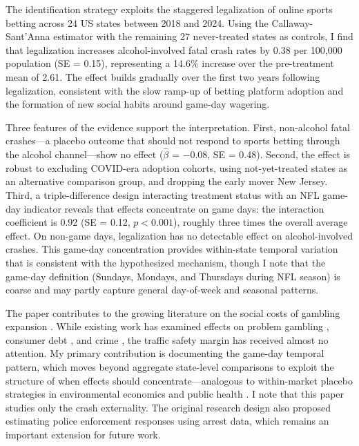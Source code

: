 \documentclass[12pt]{article}
\begin{document}
The identification strategy exploits the staggered legalization of online sports betting across 24 US states between 2018 and 2024. Using the Callaway-Sant'Anna estimator with the remaining 27 never-treated states as controls, I find that legalization increases alcohol-involved fatal crash rates by 0.38 per 100,000 population (SE = 0.15), representing a 14.6\% increase over the pre-treatment mean of 2.61. The effect builds gradually over the first two years following legalization, consistent with the slow ramp-up of betting platform adoption and the formation of new social habits around game-day wagering.

Three features of the evidence support the interpretation. First, non-alcohol fatal crashes---a placebo outcome that should not respond to sports betting through the alcohol channel---show no effect ($\hat{\beta}$ = $-$0.08, SE = 0.48). Second, the effect is robust to excluding COVID-era adoption cohorts, using not-yet-treated states as an alternative comparison group, and dropping the early mover New Jersey. Third, a triple-difference design interacting treatment status with an NFL game-day indicator reveals that effects concentrate on game days: the interaction coefficient is 0.92 (SE = 0.12, $p < 0.001$), roughly three times the overall average effect. On non-game days, legalization has no detectable effect on alcohol-involved crashes. This game-day concentration provides within-state temporal variation that is consistent with the hypothesized mechanism, though I note that the game-day definition (Sundays, Mondays, and Thursdays during NFL season) is coarse and may partly capture general day-of-week and seasonal patterns.

The paper contributes to the growing literature on the social costs of gambling expansion \citep{Gruber2023}. While existing work has examined effects on problem gambling \citep{Swanson2023}, consumer debt \citep{BakerEtAl2023}, and crime \citep{Humphreys2021}, the traffic safety margin has received almost no attention. My primary contribution is documenting the game-day temporal pattern, which moves beyond aggregate state-level comparisons to exploit the structure of when effects should concentrate---analogous to within-market placebo strategies in environmental economics \citep{CurrieDavis2020} and public health \citep{Rossin-Slater2013}. I note that this paper studies only the crash externality. The original research design also proposed estimating police enforcement responses using arrest data, which remains an important extension for future work.
\end{document}
